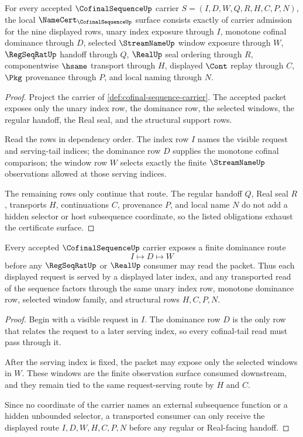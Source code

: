 \begin{theorem}\label{thm:cofinal-sequence-namecert-obligations}
For every accepted $\CofinalSequenceUp$ carrier $S=(I,D,W,Q,R,H,C,P,N)$, the local $\NameCert_{\CofinalSequenceUp}$ surface consists exactly of carrier admission for the nine displayed rows, unary index exposure through $I$, monotone cofinal dominance through $D$, selected $\StreamNameUp$ window exposure through $W$, $\RegSeqRatUp$ handoff through $Q$, $\RealUp$ seal ordering through $R$, componentwise $\hsame$ transport through $H$, displayed $\Cont$ replay through $C$, $\Pkg$ provenance through $P$, and local naming through $N$.
\end{theorem}
\begin{proof}
Project the carrier of \autoref{def:cofinal-sequence-carrier}. The accepted packet exposes only the unary index row, the dominance row, the selected windows, the regular handoff, the Real seal, and the structural support rows.

Read the rows in dependency order. The index row $I$ names the visible request and serving-tail indices; the dominance row $D$ supplies the monotone cofinal comparison; the window row $W$ selects exactly the finite $\StreamNameUp$ observations allowed at those serving indices.

The remaining rows only continue that route. The regular handoff $Q$, Real seal $R$, transports $H$, continuations $C$, provenance $P$, and local name $N$ do not add a hidden selector or host subsequence coordinate, so the listed obligations exhaust the certificate surface.
\end{proof}

\begin{theorem}\label{thm:cofinal-sequence-tail-dominance}
Every accepted $\CofinalSequenceUp$ carrier exposes a finite dominance route
$$
I\longmapsto D\longmapsto W
$$
before any $\RegSeqRatUp$ or $\RealUp$ consumer may read the packet. Thus each displayed request is served by a displayed later index, and any transported read of the sequence factors through the same unary index row, monotone dominance row, selected window family, and structural rows $H,C,P,N$.
\end{theorem}
\begin{proof}
Begin with a visible request in $I$. The dominance row $D$ is the only row that relates the request to a later serving index, so every cofinal-tail read must pass through it.

After the serving index is fixed, the packet may expose only the selected windows in $W$. These windows are the finite observation surface consumed downstream, and they remain tied to the same request-serving route by $H$ and $C$.

Since no coordinate of the carrier names an external subsequence function or a hidden unbounded selector, a transported consumer can only receive the displayed route $I,D,W,H,C,P,N$ before any regular or Real-facing handoff.
\end{proof}

